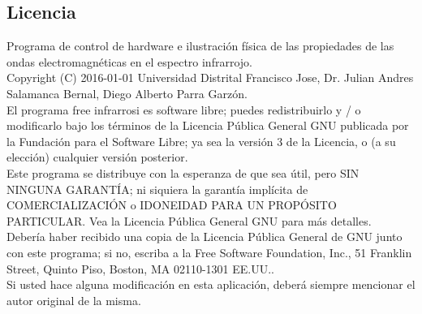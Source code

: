 \documentclass[12]{article}
\begin{document}
\begin{multicols}{2}
\subsection{Licencia}
Programa de control de hardware e ilustración física de las propiedades de las ondas electromagnéticas en el espectro infrarrojo.\\
Copyright (C) 2016-01-01  Universidad Distrital Francisco Jose, Dr. Julian Andres Salamanca Bernal, Diego Alberto Parra Garzón. \\
El programa free infrarrosi es software libre; puedes redistribuirlo y / o modificarlo bajo los términos de la Licencia Pública General GNU publicada por la Fundación para el Software Libre; ya sea 	la versión 3 de la Licencia, o (a su elección) cualquier versión posterior. \\
Este programa se distribuye con la esperanza de que sea útil, pero SIN NINGUNA GARANTÍA; ni siquiera la garantía implícita de COMERCIALIZACIÓN o IDONEIDAD PARA UN PROPÓSITO PARTICULAR. Vea la Licencia Pública General GNU para más detalles. \\
Debería haber recibido una copia de la Licencia Pública General de GNU junto con este programa; si no, escriba a la Free Software Foundation, Inc., 51 Franklin Street, Quinto Piso, Boston, MA 02110-1301 EE.UU..\\
Si usted hace alguna modificación en esta aplicación, deberá siempre mencionar el autor original de la misma.


\end{multicols}
\end{document}
